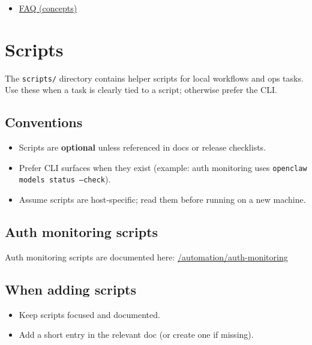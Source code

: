 \begin{itemize}
  \item \href{/help/faq}{FAQ (concepts)}
\end{itemize}



\clearpage

\section{Scripts}


The \texttt{scripts/} directory contains helper scripts for local workflows and ops tasks.
Use these when a task is clearly tied to a script; otherwise prefer the CLI.

\subsection{Conventions}


\begin{itemize}
  \item Scripts are \textbf{optional} unless referenced in docs or release checklists.
  \item Prefer CLI surfaces when they exist (example: auth monitoring uses \texttt{openclaw models status --check}).
  \item Assume scripts are host‑specific; read them before running on a new machine.
\end{itemize}


\subsection{Auth monitoring scripts}


Auth monitoring scripts are documented here:
\href{/automation/auth-monitoring}{/automation/auth-monitoring}

\subsection{When adding scripts}


\begin{itemize}
  \item Keep scripts focused and documented.
  \item Add a short entry in the relevant doc (or create one if missing).
\end{itemize}



\clearpage

